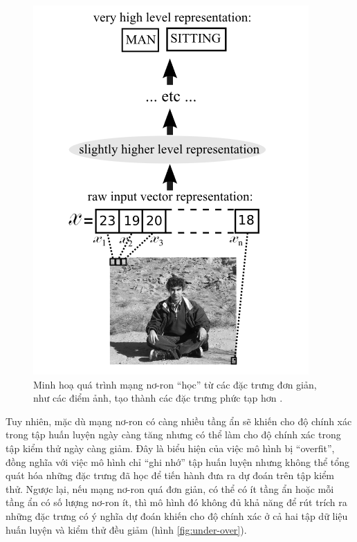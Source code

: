 \begin{figure}[htp]
	\centering
	\includegraphics[width=115 mm]{images/layers-features.png}
	\caption{Minh hoạ quá trình mạng nơ-ron ``học'' từ các đặc trưng đơn giản, như các điểm ảnh, tạo thành các đặc trưng phức tạp hơn \cite{bengio2009learning}.}
	\label{fig:layers-features}
\end{figure}

Tuy nhiên, mặc dù mạng nơ-ron có càng nhiều tầng ẩn sẽ khiến cho độ chính xác trong tập huấn luyện ngày càng tăng nhưng có thể làm cho độ chính xác trong tập kiểm thử ngày càng giảm. Đây là biểu hiện của việc mô hình bị ``overfit'', đồng nghĩa với việc mô hình chỉ ``ghi nhớ'' tập huấn luyện nhưng không thể tổng quát hóa những đặc trưng đã học để tiến hành đưa ra dự đoán trên tập kiểm thử. Ngược lại, nếu mạng nơ-ron quá đơn giản, có thể có ít tầng ẩn hoặc mỗi tầng ẩn có số lượng nơ-ron ít, thì mô hình đó không đủ khả năng để rút trích ra những đặc trưng có ý nghĩa dự đoán khiến cho độ chính xác ở cả hai tập dữ liệu huấn luyện và kiểm thử đều giảm (hình \ref{fig:under-over}).

